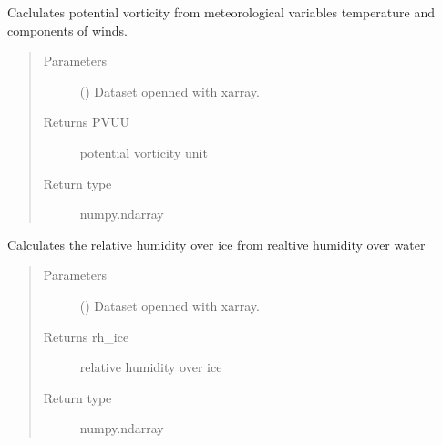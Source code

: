 \documentclass[a4paper,11pt,english]{sphinxmanual}
\begin{document}
\begin{fulllineitems}
\label{\detokenize{envlib:envlib.calc_altrv_vars.get_pvu}}
Caclulates potential vorticity from meteorological variables temperature and components of winds.
\begin{quote}\begin{description}
\item[{Parameters}] \leavevmode
{} () \textendash{} Dataset openned with xarray.

\item[{Returns PVUU}] \leavevmode
potential vorticity unit

\item[{Return type}] \leavevmode
numpy.ndarray

\end{description}\end{quote}

\end{fulllineitems}


\begin{fulllineitems}
\label{\detokenize{envlib:envlib.calc_altrv_vars.get_r}}
\end{fulllineitems}


\begin{fulllineitems}
\label{\detokenize{envlib:envlib.calc_altrv_vars.get_rh_ice}}
Calculates the relative humidity over ice from realtive humidity over water
\begin{quote}\begin{description}
\item[{Parameters}] \leavevmode
{} () \textendash{} Dataset openned with xarray.

\item[{Returns rh\_ice}] \leavevmode
relative humidity over ice

\item[{Return type}] \leavevmode
numpy.ndarray

\end{description}\end{quote}

\end{fulllineitems}
\end{document}
